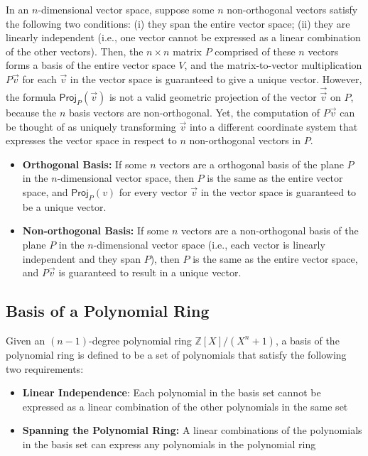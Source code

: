  In an $n$-dimensional vector space, suppose some $n$ non-orthogonal vectors satisfy the following two conditions: (i) they span the entire vector space; (ii) they are linearly independent (i.e., one vector cannot be expressed as a linear combination of the other vectors). Then, the $n \times n$ matrix $P$ comprised of these $n$ vectors forms a basis of the entire vector space $V$, and the matrix-to-vector multiplication $P\vec{v}$ for each $\vec{v}$ in the vector space is guaranteed to give a unique vector. However, the formula $\textsf{Proj}_P(\vec{v})$ is not a valid geometric projection of the vector $\vec{\vec{v}}$ on $P$, because the $n$ basis vectors are non-orthogonal. Yet, the computation of $P\vec{v}$ can be thought of as uniquely transforming $\vec{v}$ into a different coordinate system that expresses the vector space in respect to $n$ non-orthogonal vectors in $P$. 

\begin{tcolorbox}[title={\textbf{\tboxtheorem{\ref*{subsec:projection}} Uniqueness of Transformed Vectors}}]

\begin{itemize}
\item  \textbf{Orthogonal Basis:} If some $n$ vectors are a orthogonal basis of the plane $P$ in the $n$-dimensional vector space, then $P$ is the same as the entire vector space, and $\textsf{Proj}_P(v)$ for every vector $\vec{v}$ in the vector space is guaranteed to be a unique vector.
\item \textbf{Non-orthogonal Basis:} If some $n$ vectors are a non-orthogonal basis of the plane $P$ in the $n$-dimensional vector space (i.e., each vector is linearly independent and they span $P$), then $P$ is the same as the entire vector space, and $P\vec{v}$ is guaranteed to result in a unique vector.  
\end{itemize}
\end{tcolorbox}




\subsection{Basis of a Polynomial Ring}
\label{subsec:polynomial-ring-basis}

Given an $(n-1)$-degree polynomial ring $\mathbb{Z}[X] / (X^n + 1)$, a basis of the polynomial ring is defined to be a set of polynomials that satisfy the following two requirements:

\begin{itemize}

\item \textbf{Linear Independence}: Each polynomial in the basis set cannot be expressed as a linear combination of the other polynomials in the same set
\item \textbf{Spanning the Polynomial Ring:} A linear combinations of the polynomials in the basis set can express any polynomials in the polynomial ring
\end{itemize}

